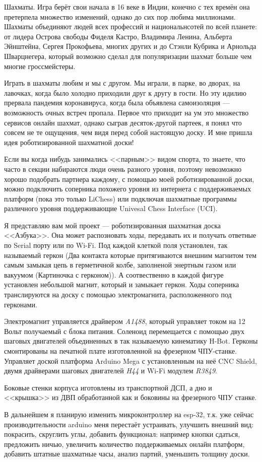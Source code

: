 \documentclass[a4paper]{article}
\begin{document}
  Шахматы. Игра берёт свои начала в 16 веке в Индии, конечно с тех времён она претерпела множество изменений, однако до сих пор любима миллионами. Шахматы объединяют людей всех профессий и национальнсотей по всей планете: от лидера Острова свободы Фиделя Кастро, Владимира Ленина, Альберта Эйнштейна, Сергея Прокофьева, многих других и до Стэнли Кубрика и Арнольда Шварцнегера, который возможно сделал для популяризации шахмат больше чем многие гроссмейстеры. 
  
  Играть в шахматы любим и мы с другом. Мы играли, в парке, во дворах, на лавочках, когда было холодно приходили друг к другу в гости. Но эту идилию прервала пандемия коронавируса, когда была объявлена самоизоляция --- возможность очных встреч пропала. Первое что приходит на ум это множество сервисов онлайн шахмат, однако сыграв десяток-другой партеек, я понял что совсем не те ощущения, чем видя перед собой настоящую доску. И мне пришла идея роботизированной шахматной доски!

  Если вы когда нибудь занимались <<парным>> видом спорта, то знаете, что часто в секции набираются люди очень разного уровня, поэтому невозможно хорошо подобрать партнера каждому, с помощью моей роботизированной доски, можно подключить соперника похожего уровня из интернета с поддерживаемых платформ (пока это только LiChess) или подключая шахматные программы различного уровня поддерживающие Univesal Chess Interface (UCI).


  Я представляю вам мой проект --- роботизированная шахматная доска <<Азбука>>. Она может распозновать ходы, передавать их и получать ответные по Serial порту или по Wi-Fi. Под каждой клеткой поля установлен, так называемый геркон (Два контакта которые притягиваются внешним магнитом тем самым замыкая цепь в герметичной колбе, заполненой энертным газом или вакуумом  (Картиночка с герконом)). А соотвественно в каждой фигуре установлен небольшой магнит, который и замыкает геркон. Ходы соперника транслируются на доску с помощью электромагнита, расположенного под герконами.

  Электромагнит управляется драйвером \textit{A1488}, который управляет током на 12 Вольт получаемый с блока питания. Соленоид перемещается с помощью двух шаговых двигателей объединенных в так называемую кинематику H-Bot. Герконы смонтированы на печатной плате изготовленной на фрезерном ЧПУ-станке. Управляет доской платформа Arduino Mega с установленным на неё CNC Shield, двумя драйверами шаговых двигателей \textit{H44} и Wi-Fi модулем \textit{R3849}.

  Боковые стенки корпуса иготовлены из транспортной ДСП, а дно и <<крышка>> из ДВП обработанной как и боковины на фрезерного ЧПУ станке.

  В дальнейшем я планирую изменить микроконтроллер на esp-32, т.к. уже сейчас производительности arduino меня перестаёт устраивать, улучшить внешний вид: покрасить, скруглить углы, добавить функционал: например кнопки сдаться, предложить ничью, увеличить количество поддерживаемых онлайн платформ, добавить штатные шахматные часы, анализ партий, уменьшить толщину доски.
  
\end{document}
